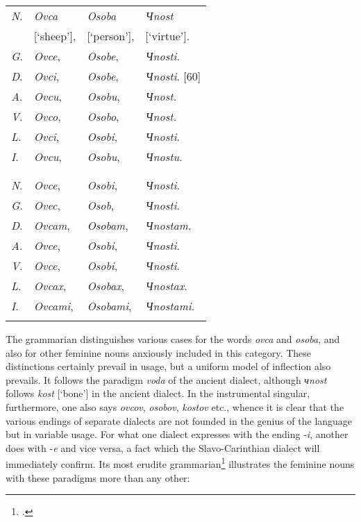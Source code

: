 \begin{longtable}{ l l l l }
    \lsptoprule
    \multicolumn{4}{ c }{Singular.} \\
    \midrule
    \textit{N}. & \textit{Ovca} & \textit{Osoba} & \textit{Чnost} \\
    & [‘sheep’], & [‘person’], & [‘virtue’]. \\
    \textit{G}. & \textit{Ovce}, & \textit{Osobe}, & \textit{Чnosti}. \\
    \textit{D}. & \textit{Ovci}, & \textit{Osobe}, & \textit{Чnosti}. [60] \\ 
    \textit{A}. & \textit{Ovcu}, & \textit{Osobu}, & \textit{Чnost}. \\
    \textit{V}. & \textit{Ovco}, & \textit{Osobo}, & \textit{Чnost}. \\
    \textit{L}. & \textit{Ovci}, & \textit{Osobi}, & \textit{Чnosti}. \\
    \textit{I}. & \textit{Ovcu}, & \textit{Osobu}, & \textit{Чnostu}. \\
    \lspbottomrule
    \\
    \lsptoprule
    \multicolumn{4}{ c }{Plural.} \\
    \midrule
    \textit{N}. & \textit{Ovce}, & \textit{Osobi}, & \textit{Чnosti}. \\
    \textit{G}. & \textit{Ovec}, & \textit{Osob}, & \textit{Чnosti}. \\
    \textit{D}. & \textit{Ovcam}, & \textit{Osobam}, & \textit{Чnostam}. \\ 
    \textit{A}. & \textit{Ovce}, & \textit{Osobi}, & \textit{Чnosti}. \\
    \textit{V}. & \textit{Ovce}, & \textit{Osobi}, & \textit{Чnosti}. \\
    \textit{L}. & \textit{Ovcax}, & \textit{Osobax}, & \textit{Чnostax}. \\
    \textit{I}. & \textit{Ovcami}, & \textit{Osobami}, & \textit{Чnostami}. \\
    \lspbottomrule
\end{longtable}

The grammarian distinguishes various cases for the words \textit{ovca} and \textit{osoba}, and also for other feminine nouns anxiously included in this category. These distinctions certainly prevail in usage, but a uniform model of inflection also prevails. It follows the paradigm \textit{voda} of the ancient dialect, although \textit{чnost} follows \textit{kost} [‘bone’] in the ancient dialect. In the instrumental singular, furthermore, one also says \textit{ovcov}, \textit{osobov}, \textit{kostov} etc., whence it is clear that the various endings of separate dialects are not founded in the genius of the language but in variable usage. For what one dialect expresses with the ending -\textit{i}, another does with -\textit{e} and vice versa, a fact which the Slavo-Carinthian dialect will immediately confirm. Its most erudite grammarian\footnote{\citet[243 (\textit{riba}, \textit{voda}), 252 (\textit{misel})]{kopitar_grammatik_1808}.} illustrates the feminine nouns with these paradigms more than any other:

